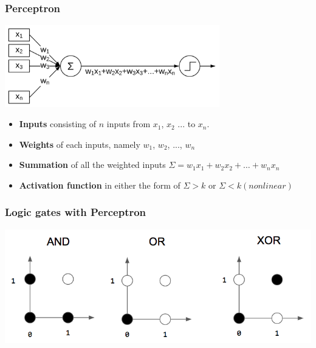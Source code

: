 \documentclass[aspectratio=169]{beamer}
\begin{document}
\begin{frame}
	\frametitle{Perceptron}
	\begin{center}
		\includegraphics[width=0.7\textwidth]{imgs/perceptron.pdf}
	\end{center}
	\begin{itemize}
		\item<2-> \textbf{Inputs} consisting of $n$ inputs from $x_1$, $x_2$ ... to $x_n$.
		\item<3-> \textbf{Weights} of each inputs, namely $w_1$, $w_2$, ..., $w_n$
		\item<4-> \textbf{Summation} of all the weighted inputs $\Sigma = w_1x_1 + w_2x_2 + \hdots + w_nx_n$
		\item<5-> \textbf{Activation function} in either the form of $\Sigma > k$ or  $\Sigma < k (nonlinear)$
	\end{itemize}
\end{frame}

\begin{frame}
	\frametitle{Logic gates with Perceptron}
	\begin{center}
		\includegraphics[width=0.7\linewidth,height=0.7\textheight,keepaspectratio]{imgs/gates.png}
	\end{center}
\end{frame}
\end{document}
